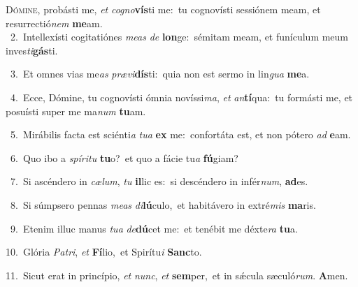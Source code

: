 \lettrine{\initial\textcolor{\initialcolor}{D}}{ómine,} probásti me, \textit{et} \textit{co}\-\textit{gno}\textbf{vís}ti me:~\star tu cognovísti sessiónem meam, et resurrectió\textit{nem} \textbf{me}\-am.\\
{\numbfont\textcolor{\numbcolor}{~2.}}~Intellexísti cogitatiónes \textit{me}\-\textit{as} \textit{de} \textbf{lon}\-ge:~\star sémitam meam, et funículum meum inves\-\textit{ti}\-\textbf{gás}ti.\par
{\numbfont\textcolor{\numbcolor}{~3.}}~Et omnes vias me\textit{as} \textit{præ}\-\textit{vi}\textbf{dís}ti:~\star quia non est sermo in lin\textit{gua} \textbf{me}\-a.\par
{\numbfont\textcolor{\numbcolor}{~4.}}~Ecce, Dómine, tu cognovísti ómnia novíssi\-\textit{ma}\-, \textit{et} \textit{an}\-\textbf{tí}qua:~\star tu formásti me, et posuísti super me ma\textit{num} \textbf{tu}\-am.\par
{\numbfont\textcolor{\numbcolor}{~5.}}~Mirábilis facta est sciénti\textit{a} \textit{tu}\-\textit{a} \textbf{ex} me:~\star confortáta est, et non pótero \textit{ad} \textbf{e}\-am.\par
{\numbfont\textcolor{\numbcolor}{~6.}}~Quo ibo a \textit{spí}\-\textit{ri}\textit{tu} \textbf{tu}\-o?~\star et quo a fácie tu\textit{a} \textbf{fú}\-giam?\par
{\numbfont\textcolor{\numbcolor}{~7.}}~Si ascéndero in \textit{cæ}\-\textit{lum}, \textit{tu} \textbf{il}\-lic es:~\star si descéndero in infér\-\textit{num}\-, \textbf{ad}\-es.\par
{\numbfont\textcolor{\numbcolor}{~8.}}~Si súmpsero pennas \textit{me}\-\textit{as} \textit{di}\-\textbf{lú}culo,~\star et habitávero in extré\textit{mis} \textbf{ma}\-ris.\par
{\numbfont\textcolor{\numbcolor}{~9.}}~Etenim illuc manus \textit{tu}\-\textit{a} \textit{de}\-\textbf{dú}cet me:~\star et tenébit me déxte\textit{ra} \textbf{tu}\-a.\par
{\numbfont\textcolor{\numbcolor}{10.}}~Glória \textit{Pa}\-\textit{tri}, \textit{et} \textbf{Fí}\-lio,~\star et Spirítu\textit{i} \textbf{Sanc}\-to.\par
{\numbfont\textcolor{\numbcolor}{11.}}~Sicut erat in princípio, \textit{et} \textit{nunc}\-, \textit{et} \textbf{sem}\-per,~\star et in sǽcula sæculó\-\textit{rum}\-. \textbf{A}\-men.\par
